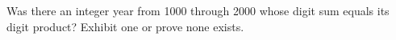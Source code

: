 Was there an integer year from 1000 through 2000 whose digit sum equals its digit product? Exhibit one or prove none exists.

